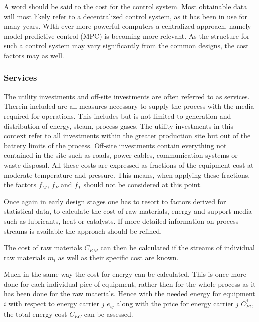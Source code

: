 A word should be said to the cost for the control system. Most obtainable data will most likely refer to 
a decentralized control system, as it has been in use for many years. WIth ever more powerful computers 
a centralized approach, namely model predictive control (MPC) is becoming more relevant. As the 
structure for such a control system may vary significantly from the common designs, the cost factors may 
as well. 
 
\subsubsection{Services}
The utility investments and off-site investments are often referred to as services. Therein included are
all measures necessary to supply the process with the media required for operations. This includes but is
not limited to generation and distribution of energy, steam, process gases. The utility investments  
in this context refer to all investments within the greater production site but out of the battery limits of the 
process. Off-site investments contain everything not contained in the site such as roads, power cables,
communication systems or waste disposal. All these costs are expressed as fractions of the equipment 
cost at moderate temperature and pressure. This means, when applying these fractions, the factors $f_M$, 
$f_P$ and $f_T$ should not be considered at this point. 

Once again in early design stages one has to resort to factors derived for statistical data, to calculate 
the cost of raw materials, energy and support media such as lubricants, heat or catalysts. If more
detailed information on process streams is available the approach should be refined. 

The cost of raw materials $C_{RM}$ can then be calculated if the streams of individual raw materials 
$m_i$ as well as their specific cost are known.  
%

Much in the same way the cost for energy can be calculated. This is once more done for each individual 
pice of equipment, rather then for the whole process as it has been done for the raw materials. Hence
with the needed energy for equipment $i$ with respect to energy carrier $j$ $e_{ij}$ along with 
the price for energy carrier $j$ $C_{EC}^j$ the total energy cost $C_{EC}$ can be assessed. 
%

